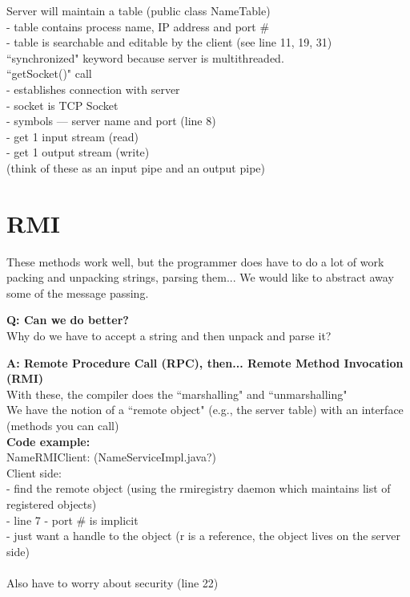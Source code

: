 \documentclass[twoside]{article}
\begin{document}
Server will maintain a table (public class NameTable) \\
 - table contains process name, IP address and port \# \\
 - table is searchable and editable by the client (see line 11, 19, 31) \\

``synchronized" keyword because server is multithreaded. \\

``getSocket()" call \\
 - establishes connection with server \\
 - socket is TCP Socket \\
 - symbols --- server name and port (line 8) \\
 - get 1 input stream (read) \\
 - get 1 output stream (write) \\
   (think of these as an input pipe and an output pipe) \\

\section{RMI}

These methods work well, but the programmer does have to do a lot of work packing and unpacking strings, parsing them...  We would like to abstract away some of the message passing.

\textbf{Q: Can we do better?} \\
Why do we have to accept a string and then unpack and parse it?

\textbf{A: Remote Procedure Call (RPC), then... Remote Method Invocation (RMI)} \\
With these, the compiler does the ``marshalling" and ``unmarshalling" \\
We have the notion of a ``remote object" (e.g., the server table) with an interface (methods you can call) \\

\textbf{Code example:} \\
NameRMIClient:  (NameServiceImpl.java?)\\
Client side: \\
 - find the remote object (using the rmiregistry daemon which maintains list of registered objects) \\
 - line 7 - port \# is implicit \\
 - just want a handle to the object (r is a reference, the object lives on the server side) \\ \\
Also have to worry about security (line 22) \\
\end{document}
